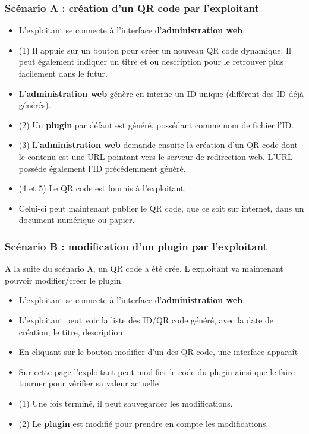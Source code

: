 \documentclass[a4paper,12pt]{article}
\begin{document}
\subsubsection{Scénario A : création d'un QR code par l'exploitant}

\begin{itemize}
  
 \item L'exploitant se connecte à l'interface d'\textbf{administration web}.
 \item (1) Il appuie sur un bouton pour créer un nouveau QR code dynamique. Il peut également indiquer un titre et ou description pour le retrouver plus facilement dans le futur.
 \item L'\textbf{administration web} génère en interne un ID unique (différent des ID déjà générés).
 \item (2) Un \textbf{plugin} par défaut est généré, possédant comme nom de fichier l'ID.
 \item (3) L'\textbf{administration web} demande ensuite la création d'un QR code dont le contenu est une URL pointant vers le serveur de redirection web. L'URL possède également l'ID précédemment généré.
 \item (4 et 5) Le QR code est fournis à l'exploitant.
 \item Celui-ci peut maintenant publier le QR code, que ce soit sur internet, dans un document numérique ou papier.
  
\end{itemize}

\subsubsection{Scénario B : modification d'un plugin par l'exploitant}

A la suite du scénario A, un QR code a été crée. L'exploitant va maintenant pouvoir modifier/créer le plugin.

\begin{itemize}
  
 \item L'exploitant se connecte à l'interface d'\textbf{administration web}.
 \item L'exploitant peut voir la liste des ID/QR code généré, avec la date de création, le titre, description.
 \item En cliquant sur le bouton modifier d'un des QR code, une interface apparaît
 \item Sur cette page l'exploitant peut modifier le code du plugin ainsi que le faire tourner pour vérifier sa valeur actuelle
 \item (1) Une fois terminé, il peut sauvegarder les modifications.
 \item (2) Le \textbf{plugin} est modifié pour prendre en compte les modifications.
  
\end{itemize}
\end{document}
